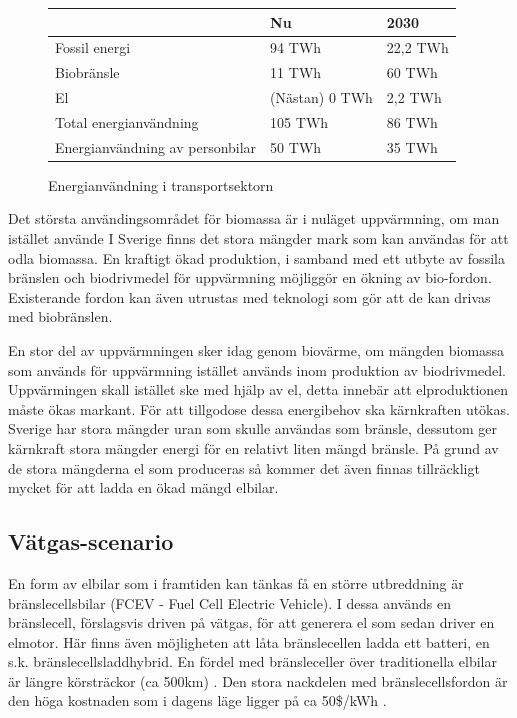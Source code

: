 \documentclass[a4paper,11pt,fleqn, titlepage]{article}
\begin{document}
\begin{figure}[h!]
	\begin{center}
	\begin{tabular}{ | l | l | l | }
	\hline
						& Nu		& 2030 \\ \hline
	Fossil energi				& 94 TWh	& 22,2 TWh \\ \hline
	Biobränsle				& 11 TWh	& 60 TWh \\ \hline %
	El					& (Nästan) 0 TWh &  2,2 TWh \\ \hline %
	Total energianvändning		& 105 TWh	& 86 TWh \\ \hline
	Energianvändning av personbilar	& 50 TWh	& 35 TWh \\ \hline
	\end{tabular}
	\caption{Energianvändning i transportsektorn}
	\label{tab:scen1energi}
\end{center}
\end{figure}



Det största användingsområdet för biomassa är i nuläget uppvärmning, om man istället använde
I Sverige finns det stora mängder mark som kan användas för att odla biomassa. En kraftigt ökad produktion, i samband med ett utbyte av fossila bränslen och biodrivmedel för uppvärmning möjliggör en ökning av bio-fordon. Existerande fordon kan även utrustas med teknologi som gör att de kan drivas med biobränslen.

En stor del av uppvärmningen sker idag genom biovärme, om mängden biomassa som används för uppvärmning istället används inom produktion av biodrivmedel. Uppvärmingen skall istället ske med hjälp av el, detta innebär att elproduktionen måste ökas markant. För att tillgodose dessa energibehov ska kärnkraften utökas. Sverige har stora mängder uran som skulle användas som bränsle, dessutom ger kärnkraft stora mängder energi för en relativt liten mängd bränsle. På grund av de stora mängderna el som produceras så kommer det även finnas tillräckligt mycket för att ladda en ökad mängd elbilar.

\subsection{Vätgas-scenario}
En form av elbilar som i framtiden kan tänkas få en större utbreddning är
bränslecellsbilar (FCEV - Fuel Cell Electric Vehicle). I dessa används en
bränslecell, förslagsvis driven på vätgas, för att generera el som sedan
driver en elmotor. Här finns även möjligheten att låta bränslecellen ladda
ett batteri, en s.k. bränslecellsladdhybrid. En fördel med bränsleceller
över traditionella elbilar är längre körsträckor (ca 500km)
\cite{fossilfrihet}. Den stora nackdelen med bränslecellsfordon är den höga
kostnaden som i dagens läge ligger på ca 50\$/kWh \cite{fossilfrihet}.
\end{document}

